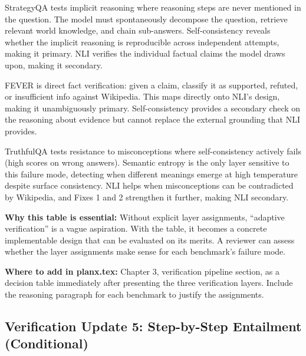 \documentclass[11pt,a4paper]{article}
\begin{document}
{StrategyQA tests implicit reasoning where reasoning steps are never mentioned in the question. The model must spontaneously decompose the question, retrieve relevant world knowledge, and chain sub-answers. Self-consistency reveals whether the implicit reasoning is reproducible across independent attempts, making it primary. NLI verifies the individual factual claims the model draws upon, making it secondary.

FEVER is direct fact verification: given a claim, classify it as supported, refuted, or insufficient info against Wikipedia. This maps directly onto NLI's design, making it unambiguously primary. Self-consistency provides a secondary check on the reasoning about evidence but cannot replace the external grounding that NLI provides.

TruthfulQA tests resistance to misconceptions where self-consistency actively fails (high scores on wrong answers). Semantic entropy is the only layer sensitive to this failure mode, detecting when different meanings emerge at high temperature despite surface consistency. NLI helps when misconceptions can be contradicted by Wikipedia, and Fixes 1 and 2 strengthen it further, making NLI secondary.

\textbf{Why this table is essential:} Without explicit layer assignments, ``adaptive verification'' is a vague aspiration. With the table, it becomes a concrete implementable design that can be evaluated on its merits. A reviewer can assess whether the layer assignments make sense for each benchmark's failure mode.

\textbf{Where to add in planx.tex:} Chapter 3, verification pipeline section, as a decision table immediately after presenting the three verification layers. Include the reasoning paragraph for each benchmark to justify the assignments.
}

\subsection{Verification Update 5: Step-by-Step Entailment (Conditional)}
\end{document}
